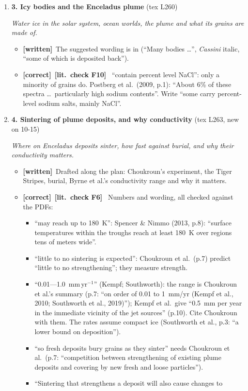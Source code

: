 \documentclass[11pt]{article}
\newcommand{\Have}{\textcolor{have}{\textbf{[written]}}\ }
\newcommand{\Pg}[3]{\item \textbf{#1} {\small(#2)}\par\textit{#3}}
\newcommand{\tC}{\textcolor{miss}{\textbf{[correct]}}\ }
\newcommand{\Chk}[1]{\textcolor{chk}{\textbf{[lit.\ check #1]}}\ }
\begin{document}
\begin{enumerate}
\begin{itemize}
  \end{itemize}
\Pg{3. Icy bodies and the Enceladus plume}{tex L260}{Water ice in the solar system, ocean worlds, the plume and what its grains are made of.}
  \begin{itemize}
  \item \Have The suggested wording is in (``Many bodies \ldots'',
    \textit{Cassini} italic, ``some of which is deposited back'').
  \item \tC \Chk{F10} ``contain percent level NaCl'': only a minority of
    grains do. Postberg et al.\ (2009, p.1): ``About 6\% of these spectra
    \ldots\ particularly high sodium contents''. Write ``some carry
    percent-level sodium salts, mainly NaCl''.
  \end{itemize}
\Pg{4. Sintering of plume deposits, and why conductivity}{tex L263, new on 10-15}{Where on Enceladus deposits sinter, how fast against burial, and why their conductivity matters.}
  \begin{itemize}
  \item \Have Drafted along the plan: Choukroun's experiment, the Tiger
    Stripes, burial, Byrne et al.'s conductivity range and why it matters.
  \item \tC \Chk{F6} Numbers and wording, all checked against the PDFs:
    \begin{itemize}
    \item ``may reach up to 180~K'': Spencer \& Nimmo (2013, p.8): ``surface
      temperatures within the troughs reach at least 180~K over regions tens
      of meters wide''.
    \item ``little to no sintering is expected'': Choukroun et al.\ (p.7)
      predict ``little to no strengthening''; they measure strength.
    \item ``0.01---1.0~mm\,yr$^{-1}$'' (Kempf; Southworth): the range is
      Choukroun et al.'s summary (p.7: ``on order of 0.01 to 1~mm/yr (Kempf et
      al., 2010; Southworth et al., 2019)''); Kempf et al.\ give ``0.5~mm per
      year in the immediate vicinity of the jet sources'' (p.10). Cite
      Choukroun with them. The rates assume compact ice (Southworth et al.,
      p.3: ``a lower bound on deposition'').
    \item ``so fresh deposits bury grains as they sinter'' needs Choukroun et
      al.\ (p.7: ``competition between strengthening of existing plume
      deposits and covering by new fresh and loose particles'').
    \item ``Sintering that strengthens a deposit will also cause changes to

\end{itemize}
\end{itemize}
\end{enumerate}
\end{document}
